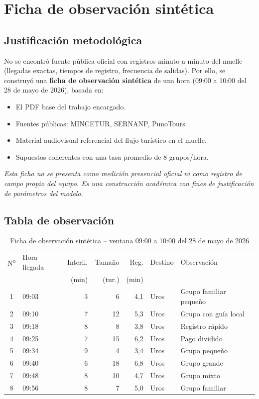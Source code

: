 \documentclass[12pt,a4paper]{article}
\begin{document}
\section{Ficha de observación sintética}

\subsection{Justificación metodológica}

No se encontró fuente pública oficial con registros minuto a minuto del
muelle (llegadas exactas, tiempos de registro, frecuencia de salidas). Por
ello, se construyó una \textbf{ficha de observación sintética} de una hora
(09:00 a 10:00 del 28 de mayo de 2026), basada en:

\begin{itemize}[noitemsep]
  \item El PDF base del trabajo encargado.
  \item Fuentes públicas: MINCETUR, SERNANP, PunoTours.
  \item Material audiovisual referencial del flujo turístico en el muelle.
  \item Supuestos coherentes con una tasa promedio de 8 grupos/hora.
\end{itemize}

\noindent\textit{Esta ficha no se presenta como medición presencial oficial
ni como registro de campo propio del equipo. Es una construcción académica
con fines de justificación de parámetros del modelo.}

\subsection{Tabla de observación}

\begin{table}[H]
  \centering
  \caption{Ficha de observación sintética -- ventana 09:00 a 10:00 del 28 de mayo de 2026}
  \small
  \begin{tabularx}{\textwidth}{@{} c l r r r l X @{}}
    \toprule
    N\textsuperscript{o} & Hora llegada & Interll. & Tamaño & Reg. & Destino & Observación \\
     & & (min) & (tur.) & (min) & & \\
    \midrule
    1 & 09:03 & 3 &  6 & 4,1 & Uros & Grupo familiar pequeño \\
    2 & 09:10 & 7 & 12 & 5,3 & Uros & Grupo con guía local   \\
    3 & 09:18 & 8 &  8 & 3,8 & Uros & Registro rápido        \\
    4 & 09:25 & 7 & 15 & 6,2 & Uros & Pago dividido          \\
    5 & 09:34 & 9 &  4 & 3,4 & Uros & Grupo pequeño          \\
    6 & 09:40 & 6 & 18 & 6,8 & Uros & Grupo grande           \\
    7 & 09:48 & 8 & 10 & 4,7 & Uros & Grupo mixto            \\
    8 & 09:56 & 8 &  7 & 5,0 & Uros & Grupo familiar         \\
    \bottomrule
  \end{tabularx}
\end{table}
\end{document}
